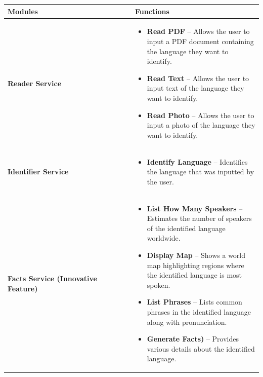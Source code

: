 \begin{longtable}{p{0.5\linewidth} | p{0.5\linewidth}}
\toprule
\textbf{Modules} & \textbf{Functions} \\
\midrule
\endhead

\textbf{Reader Service} & 
\begin{itemize}
    \item \textbf{Read PDF} – Allows the user to input a PDF document containing the language they want to identify.
    \item \textbf{Read Text} – Allows the user to input text of the language they want to identify.
    \item \textbf{Read Photo} – Allows the user to input a photo of the language they want to identify.
\end{itemize} \\

\hline

\textbf{Identifier Service} & 
\begin{itemize}
    \item \textbf{Identify Language} – Identifies the language that was inputted by the user.
\end{itemize} \\


\hline

\textbf{Facts Service (Innovative Feature)} & 
\begin{itemize}
    \item \textbf{List How Many Speakers} – Estimates the number of speakers of the identified language worldwide.
    \item \textbf{Display Map} – Shows a world map highlighting regions where the identified language is most spoken.
    \item \textbf{List Phrases} – Lists common phrases in the identified language along with pronunciation.
    \item \textbf{Generate Facts)} – Provides various details about the identified language.
\end{itemize} \\
\bottomrule
\end{longtable}


